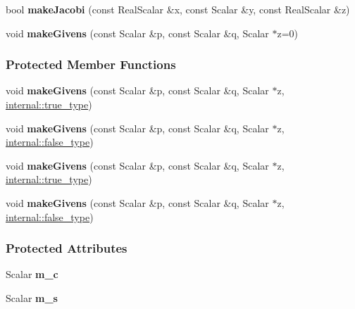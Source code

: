 \begin{DoxyCompactItemize}
\item 
\mbox{\label{group___jacobi___module_a6572f272cac38e070a99b466dd1fbc74}} 
bool {\bfseries make\+Jacobi} (const Real\+Scalar \&x, const Scalar \&y, const Real\+Scalar \&z)
\item 
\mbox{\label{group___jacobi___module_af73c81e9cc139b7e0d877ce553b02ec0}} 
void {\bfseries make\+Givens} (const Scalar \&p, const Scalar \&q, Scalar $\ast$z=0)
\end{DoxyCompactItemize}
\subsubsection*{Protected Member Functions}
\begin{DoxyCompactItemize}
\item 
\mbox{\label{group___jacobi___module_ae9580cfade95b2a9067fd07eb292024e}} 
void {\bfseries make\+Givens} (const Scalar \&p, const Scalar \&q, Scalar $\ast$z, \hyperlink{struct_eigen_1_1internal_1_1true__type}{internal\+::true\+\_\+type})
\item 
\mbox{\label{group___jacobi___module_acfbe3dc2abfa694ec8c7540fd76077c4}} 
void {\bfseries make\+Givens} (const Scalar \&p, const Scalar \&q, Scalar $\ast$z, \hyperlink{struct_eigen_1_1internal_1_1false__type}{internal\+::false\+\_\+type})
\item 
\mbox{\label{group___jacobi___module_ae9580cfade95b2a9067fd07eb292024e}} 
void {\bfseries make\+Givens} (const Scalar \&p, const Scalar \&q, Scalar $\ast$z, \hyperlink{struct_eigen_1_1internal_1_1true__type}{internal\+::true\+\_\+type})
\item 
\mbox{\label{group___jacobi___module_acfbe3dc2abfa694ec8c7540fd76077c4}} 
void {\bfseries make\+Givens} (const Scalar \&p, const Scalar \&q, Scalar $\ast$z, \hyperlink{struct_eigen_1_1internal_1_1false__type}{internal\+::false\+\_\+type})
\end{DoxyCompactItemize}
\subsubsection*{Protected Attributes}
\begin{DoxyCompactItemize}
\item 
\mbox{\label{group___jacobi___module_a3dcad29a9dc19b6cedf827a206cb52a4}} 
Scalar {\bfseries m\+\_\+c}
\item 
\mbox{\label{group___jacobi___module_ad074a548f9c0a9e43b09a6e50164492a}} 
Scalar {\bfseries m\+\_\+s}
\end{DoxyCompactItemize}


